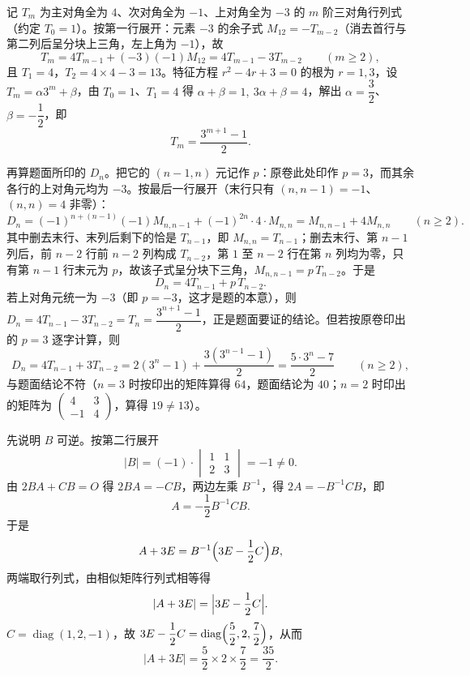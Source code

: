 
\begin{solution}
记 $T_m$ 为主对角全为 $4$、次对角全为 $-1$、上对角全为 $-3$ 的 $m$ 阶三对角行列式（约定 $T_0=1$）。按第一行展开：元素 $-3$ 的余子式 $M_{12}=-T_{m-2}$（消去首行与第二列后呈分块上三角，左上角为 $-1$），故
\[
T_m=4T_{m-1}+(-3)(-1)M_{12}=4T_{m-1}-3T_{m-2}\qquad(m\ge2),
\]
且 $T_1=4$，$T_2=4\times4-3=13$。特征方程 $r^{2}-4r+3=0$ 的根为 $r=1,3$，设 $T_m=\alpha3^{m}+\beta$，由 $T_0=1$、$T_1=4$ 得 $\alpha+\beta=1,\ 3\alpha+\beta=4$，解出 $\alpha=\dfrac32$、$\beta=-\dfrac12$，即
\[
T_m=\frac{3^{m+1}-1}{2}.
\]

再算题面所印的 $D_n$。把它的 $(n-1,n)$ 元记作 $p$：原卷此处印作 $p=3$，而其余各行的上对角元均为 $-3$。按最后一行展开（末行只有 $(n,n-1)=-1$、$(n,n)=4$ 非零）：
\[
D_n=(-1)^{n+(n-1)}(-1)M_{n,n-1}+(-1)^{2n}\cdot4\cdot M_{n,n}=M_{n,n-1}+4M_{n,n}\qquad(n\ge2).
\]
其中删去末行、末列后剩下的恰是 $T_{n-1}$，即 $M_{n,n}=T_{n-1}$；删去末行、第 $n-1$ 列后，前 $n-2$ 行前 $n-2$ 列构成 $T_{n-2}$，第 $1$ 至 $n-2$ 行在第 $n$ 列均为零，只有第 $n-1$ 行末元为 $p$，故该子式呈分块下三角，$M_{n,n-1}=p\,T_{n-2}$。于是
\[
D_n=4T_{n-1}+p\,T_{n-2}.
\]
若上对角元统一为 $-3$（即 $p=-3$，这才是题的本意），则 $D_n=4T_{n-1}-3T_{n-2}=T_n=\dfrac{3^{n+1}-1}{2}$，正是题面要证的结论。但若按原卷印出的 $p=3$ 逐字计算，则
\[
D_n=4T_{n-1}+3T_{n-2}=2(3^{n}-1)+\frac{3(3^{n-1}-1)}{2}=\frac{5\cdot3^{n}-7}{2}\qquad(n\ge2),
\]
与题面结论不符（$n=3$ 时按印出的矩阵算得 $64$，题面结论为 $40$；$n=2$ 时印出的矩阵为 $\begin{pmatrix}4&3\\-1&4\end{pmatrix}$，算得 $19\ne13$）。
\end{solution}

\begin{solution}
先说明 $B$ 可逆。按第二行展开
\[
|B|=(-1)\cdot\begin{vmatrix}1&1\\2&3\end{vmatrix}=-1\ne0 .
\]
由 $2BA+CB=O$ 得 $2BA=-CB$，两边左乘 $B^{-1}$，得 $2A=-B^{-1}CB$，即
\[
A=-\frac12B^{-1}CB .
\]
于是
\[
A+3E=B^{-1}\Bigl(3E-\frac12C\Bigr)B ,
\]
两端取行列式，由相似矩阵行列式相等得
\[
|A+3E|=\Bigl|3E-\frac12C\Bigr| .
\]
$C=\operatorname{diag}(1,2,-1)$，故 $3E-\dfrac12C=\operatorname{diag}\Bigl(\dfrac52,2,\dfrac72\Bigr)$，从而
\[
|A+3E|=\frac52\times2\times\frac72=\frac{35}{2}.
\]
\end{solution}

